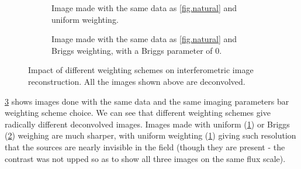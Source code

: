 \begin{figure}[h!]
\begin{subfigure}{.48\textwidth}
\caption{\label{fig.uniform} Image made with the same data as \cref{fig.natural} and uniform weighting.}
\end{subfigure}
\hfill
\begin{subfigure}{.48\textwidth}
\caption{\label{fig.briggs0} Image made with the same data as \cref{fig.natural} and Briggs weighting, with a Briggs parameter of 0.}
\end{subfigure}
\caption{\label{fig.briggs-weighting}Impact of different weighting schemes on interferometric image reconstruction. All the images shown above are deconvolved.}
\end{figure}

\pg
\cref{fig.briggs-weighting} shows images done with the same data and the same imaging parameters bar weighting scheme choice. We can see that different weighting schemes give radically different deconvolved images. Images made with uniform (\cref{fig.uniform}) or Briggs (\cref{fig.briggs0}) weighing are much sharper, with uniform weighting (\cref{fig.uniform}) giving such resolution that the sources are nearly invisible in the field (though they are present - the contrast was not upped so as to show all three images on the same flux scale). 

